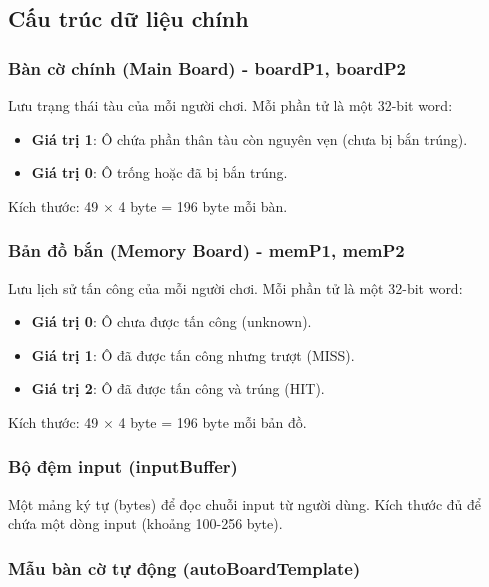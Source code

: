 \subsection{Cấu trúc dữ liệu chính}

\subsubsection{Bàn cờ chính (Main Board) - boardP1, boardP2}

Lưu trạng thái tàu của mỗi người chơi. Mỗi phần tử là một 32-bit word:

\begin{itemize}
    \item \textbf{Giá trị 1}: Ô chứa phần thân tàu còn nguyên vẹn (chưa bị bắn trúng).
    \item \textbf{Giá trị 0}: Ô trống hoặc đã bị bắn trúng.
\end{itemize}

Kích thước: 49 $\times$ 4 byte = 196 byte mỗi bàn.

\subsubsection{Bản đồ bắn (Memory Board) - memP1, memP2}

Lưu lịch sử tấn công của mỗi người chơi. Mỗi phần tử là một 32-bit word:

\begin{itemize}
    \item \textbf{Giá trị 0}: Ô chưa được tấn công (unknown).
    \item \textbf{Giá trị 1}: Ô đã được tấn công nhưng trượt (MISS).
    \item \textbf{Giá trị 2}: Ô đã được tấn công và trúng (HIT).
\end{itemize}

Kích thước: 49 $\times$ 4 byte = 196 byte mỗi bản đồ.

\subsubsection{Bộ đệm input (inputBuffer)}

Một mảng ký tự (bytes) để đọc chuỗi input từ người dùng. Kích thước đủ để chứa một dòng input (khoảng 100-256 byte).

\subsubsection{Mẫu bàn cờ tự động (autoBoardTemplate)}

